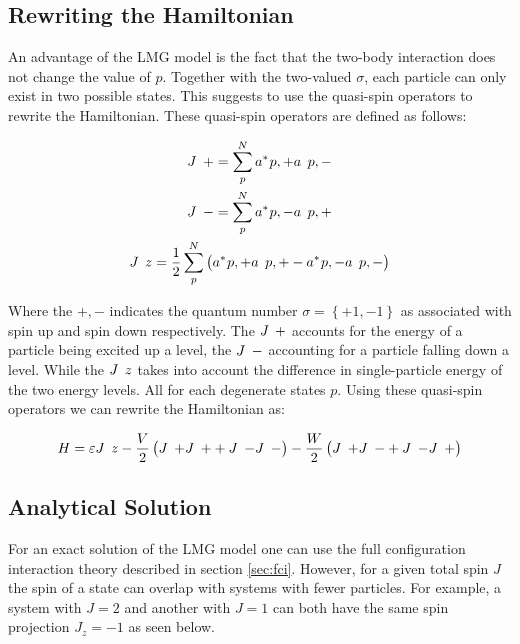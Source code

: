 \subsection{Rewriting the Hamiltonian}

An advantage of the LMG model is the fact that the two-body interaction does not change the value of $p$. Together with the two-valued $\sigma$, each particle can only exist in two possible states. This suggests to use the quasi-spin operators to rewrite the Hamiltonian. These quasi-spin operators are defined as follows:

\begin{equation} \label{eq:quasispin}
\begin{gathered}
    \op{J}{+} = \sum_p^N \hc{a}{p, +}\op{a}{p,-} \\
    \op{J}{-} = \sum_p^N \hc{a}{p, -}\op{a}{p,+} \\
    \op{J}{z} = \frac{1}{2}\sum_p^N\left(\hc{a}{p,+} \op{a}{p,+} -  \hc{a}{p,-} \op{a}{p,-} \right )
\end{gathered}   
\end{equation}


Where the $+, -$ indicates the quantum number $\sigma = \left \{ +1, -1\right \}$ as associated with spin up and spin down respectively. The $\op{J}{+}$ accounts for the energy of a particle being excited up a level, the $\op{J}{-}$ accounting for a particle falling down a level. While the $\op{J}{z}$ takes into account the difference in single-particle energy of the two energy levels. All for each degenerate states $p$. Using these quasi-spin operators we can rewrite the Hamiltonian as:

\begin{equation}\label{eq:quasiHamilt}
    H = \varepsilon \op{J}{z} - \frac{V}{2} \left ( \op{J}{+}\op{J}{+}  + \op{J}{-}\op{J}{-} \right ) - \frac{W}{2} \left (\op{J}{+} \op{J}{-} + \op{J}{-}\op{J}{+} \right )
\end{equation}

\subsection{Analytical Solution}

For an exact solution of the LMG model one can use the full configuration interaction theory described in section \ref{sec:fci}. However, for a given total spin $J$ the spin of a state can overlap with systems with fewer particles. For example, a system with $J=2$ and another with $J = 1$ can both have the same spin projection $J_z=-1$ as seen below.

